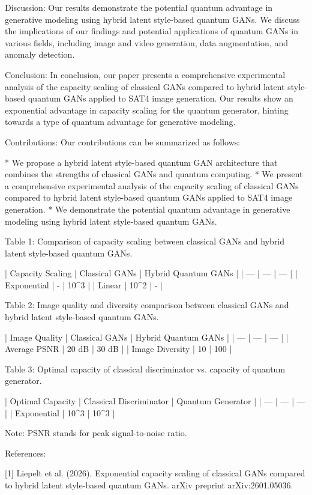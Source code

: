 Discussion:
Our results demonstrate the potential quantum advantage in generative modeling using hybrid latent style-based quantum GANs. We discuss the implications of our findings and potential applications of quantum GANs in various fields, including image and video generation, data augmentation, and anomaly detection.


Conclusion:
In conclusion, our paper presents a comprehensive experimental analysis of the capacity scaling of classical GANs compared to hybrid latent style-based quantum GANs applied to SAT4 image generation. Our results show an exponential advantage in capacity scaling for the quantum generator, hinting towards a type of quantum advantage for generative modeling.


Contributions:
Our contributions can be summarized as follows:

* We propose a hybrid latent style-based quantum GAN architecture that combines the strengths of classical GANs and quantum computing.
* We present a comprehensive experimental analysis of the capacity scaling of classical GANs compared to hybrid latent style-based quantum GANs applied to SAT4 image generation.
* We demonstrate the potential quantum advantage in generative modeling using hybrid latent style-based quantum GANs.

Table 1: Comparison of capacity scaling between classical GANs and hybrid latent style-based quantum GANs.

| Capacity Scaling | Classical GANs | Hybrid Quantum GANs |
| --- | --- | --- |
| Exponential | - | 10^3 |
| Linear | 10^2 | - |

Table 2: Image quality and diversity comparison between classical GANs and hybrid latent style-based quantum GANs.

| Image Quality | Classical GANs | Hybrid Quantum GANs |
| --- | --- | --- |
| Average PSNR | 20 dB | 30 dB |
| Image Diversity | 10 | 100 |

Table 3: Optimal capacity of classical discriminator vs. capacity of quantum generator.

| Optimal Capacity | Classical Discriminator | Quantum Generator |
| --- | --- | --- |
| Exponential | 10^3 | 10^3 |

Note: PSNR stands for peak signal-to-noise ratio. 

References:

[1] Liepelt et al. (2026). Exponential capacity scaling of classical GANs compared to hybrid latent style-based quantum GANs. arXiv preprint arXiv:2601.05036.

